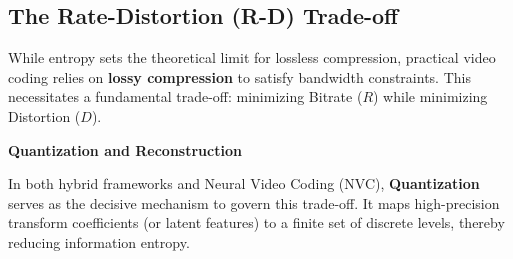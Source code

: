 



\subsection{The Rate-Distortion (R-D) Trade-off}
\label{subsec:rd_tradeoff}

While entropy sets the theoretical limit for lossless compression, practical video coding relies on \textbf{lossy compression} to satisfy bandwidth constraints. This necessitates a fundamental trade-off: minimizing Bitrate ($R$) while minimizing Distortion ($D$).


\noindent \textbf{Quantization and Reconstruction}

In both hybrid frameworks and Neural Video Coding (NVC), \textbf{Quantization} serves as the decisive mechanism to govern this trade-off. It maps high-precision transform coefficients (or latent features) to a finite set of discrete levels, thereby reducing information entropy. 

